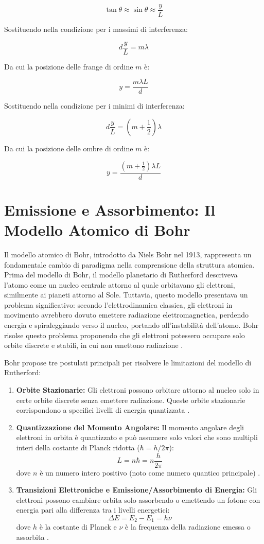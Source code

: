 \documentclass[12pt,a4paper]{report}
\begin{document}
\[ \tan \theta \approx \sin \theta \approx \frac{y}{L} \]

Sostituendo nella condizione per i massimi di interferenza:

\[ d \frac{y}{L} = m \lambda \]

Da cui la posizione delle frange di ordine \(m\) è:

\[ y = \frac{m \lambda L}{d} \]

Sostituendo nella condizione per i minimi di interferenza:

\[ d \frac{y}{L} = \left( m + \frac{1}{2} \right) \lambda \]

Da cui la posizione delle ombre di ordine \(m\) è:

\[ y = \frac{\left(m + \frac{1}{2} \right) \lambda L}{d} \]

\section{Emissione e Assorbimento: Il Modello Atomico di Bohr}

Il modello atomico di Bohr, introdotto da Niels Bohr nel 1913, rappresenta un fondamentale cambio di paradigma nella comprensione della struttura atomica. Prima del modello di Bohr, il modello planetario di Rutherford descriveva l'atomo come un nucleo centrale attorno al quale orbitavano gli elettroni, similmente ai pianeti attorno al Sole. Tuttavia, questo modello presentava un problema significativo: secondo l'elettrodinamica classica, gli elettroni in movimento avrebbero dovuto emettere radiazione elettromagnetica, perdendo energia e spiraleggiando verso il nucleo, portando all'instabilità dell'atomo. Bohr risolse questo problema proponendo che gli elettroni potessero occupare solo orbite discrete e stabili, in cui non emettono radiazione \cite{Bohr1913}.

Bohr propose tre postulati principali per risolvere le limitazioni del modello di Rutherford:

\begin{enumerate}
    \item \textbf{Orbite Stazionarie:} Gli elettroni possono orbitare attorno al nucleo solo in certe orbite discrete senza emettere radiazione. Queste orbite stazionarie corrispondono a specifici livelli di energia quantizzata \cite{BohrModelBritannica}.
    \item \textbf{Quantizzazione del Momento Angolare:} Il momento angolare degli elettroni in orbita è quantizzato e può assumere solo valori che sono multipli interi della costante di Planck ridotta (\(\hbar = h/2\pi\)):
        \[L = n\hbar = n\frac{h}{2\pi}\]
        dove \( n \) è un numero intero positivo (noto come numero quantico principale) \cite{HyperPhysicsBohr}.
 
    \item \textbf{Transizioni Elettroniche e Emissione/Assorbimento di Energia:} Gli elettroni possono cambiare orbita solo assorbendo o emettendo un fotone con energia pari alla differenza tra i livelli energetici:
        \[\Delta E = E_2 - E_1 = h\nu\]
        dove \( h \) è la costante di Planck e \( \nu \) è la frequenza della radiazione emessa o assorbita \cite{Bohr1913}.
 \end{enumerate}
\end{document}
